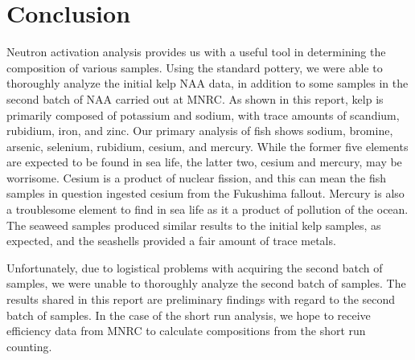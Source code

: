 \documentclass[]{article}
\begin{document}
\begin{table}[htb!]
\centering
\caption{ This table shows various elemental composition percentages of metals for the seashell NAA.}
\end{table}

\pagebreak

\section{Conclusion}
Neutron activation analysis provides us with a useful tool in determining the composition of various samples. Using the standard pottery, we were able to thoroughly analyze the initial kelp NAA data, in addition to some samples in the second batch of NAA carried out at MNRC. As shown in this report, kelp is primarily composed of potassium and sodium, with trace amounts of scandium, rubidium, iron, and zinc. Our primary analysis of fish shows sodium, bromine, arsenic, selenium, rubidium, cesium, and mercury. While the former five elements are expected to be found in sea life, the latter two, cesium and mercury, may be worrisome. Cesium is a product of nuclear fission, and this can mean the fish samples in question ingested cesium from the Fukushima fallout. Mercury is also a troublesome element to find in sea life as it a product of pollution of the ocean. The seaweed samples produced similar results to the initial kelp samples, as expected, and the seashells provided a fair amount of trace metals.


Unfortunately, due to logistical problems with acquiring the second batch of samples, we were unable to thoroughly analyze the second batch of samples. The results shared in this report are preliminary findings with regard to the second batch of samples. In the case of the short run analysis, we hope to receive efficiency data from MNRC to calculate compositions from the short run counting.
\end{document}
